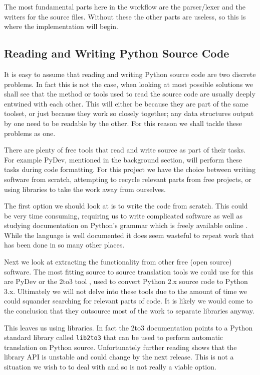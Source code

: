 \documentclass{report}
\begin{document}
The most fundamental parts here in the workflow are the parser/lexer and the writers for the source files.
Without these the other parts are useless, so this is where the implementation will begin.

\subsection{Reading and Writing Python Source Code}

It is easy to assume that reading and writing Python source code are two discrete problems. In fact this is not the case,
when looking at most possible solutions we shall see that the method or tools used to read the source code are usually deeply
entwined with each other. This will either be because they are part of the same toolset, or just because they work so closely together;
any data structures output by one need to be readable by the other. For this reason we shall tackle these problems as one.

There are plenty of free tools that read and write source as part of their tasks. For example PyDev, mentioned in the background section, will
perform these tasks during code formatting. For this project we have the choice between writing software from scratch, attempting
to recycle relevant parts from free projects, or using libraries to take the work away from ourselves.

The first option we should look at is to write the code from scratch. This could be very time consuming, requiring
us to write complicated software as well as studying documentation on Python's grammar which is freely available online \cite{pygrammar}.
While the language is well documented it does seem wasteful to repeat work that has been done in so many other places.

Next we look at extracting the functionality from other free (open source) software. The most fitting source to source translation tools
we could use for this are PyDev or the 2to3 tool \cite{2to3}, used to convert Python 2.x source code to Python 3.x. Ultimately we will not
delve into these tools due to the amount of time we could squander searching for relevant parts of code. It is likely we
would come to the conclusion that they outsource most of the work to separate libraries anyway.

This leaves us using libraries. In fact the 2to3 documentation points to a Python standard library called \texttt{lib2to3} that can be used to
perform automatic translation on Python source. Unfortunately further reading shows that the library API is unstable and could change by
the next release. This is not a situation we wish to to deal with and so is not really a viable option.
\end{document}
